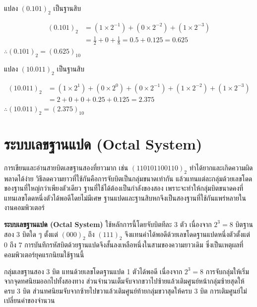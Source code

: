 \begin{ex}
\label{ex:bin-frac-to-dec}
แปลง $(0.101)_2$ เป็นฐานสิบ
\end{ex}
\begin{solution}
\begin{align*}
(0.101)_2 &= (1\times2^{-1})+(0\times2^{-2})+(1\times2^{-3})\\
&= \frac{1}{2} + 0 + \frac{1}{8} = 0.5 + 0.125 = 0.625
\end{align*}
$\therefore (0.101)_2 = (0.625)_{10}$ \solhere
\end{solution}

\begin{ex}
\label{ex:bin-mixed-to-dec}
แปลง $(10.011)_2$ เป็นฐานสิบ
\end{ex}
\begin{solution}
\begin{align*}
(10.011)_2 &= (1\times2^1)+(0\times2^0)+(0\times2^{-1})+(1\times2^{-2})+(1\times2^{-3})\\
&= 2 + 0 + 0 + 0.25 + 0.125 = 2.375
\end{align*}
$\therefore (10.011)_2 = (2.375)_{10}$ \solhere
\end{solution}

\section{ระบบเลขฐานแปด (Octal System)}
\label{sec:octal-system}

การเขียนและอ่านสายบิตเลขฐานสองที่ยาวมาก เช่น $(110101100110)_2$ ทำได้ยากและเกิดความผิดพลาดได้ง่าย วิธีลดความยาวที่ใช้กันคือการจับบิตเป็นกลุ่มขนาดเท่ากัน แล้วแทนแต่ละกลุ่มด้วยเลขโดดของฐานที่ใหญ่กว่าเพียงตัวเดียว ฐานที่ใช้ได้ต้องเป็นกำลังของสอง เพราะจะทำให้กลุ่มบิตขนาดคงที่แทนเลขโดดหนึ่งตัวได้พอดีโดยไม่มีเศษ ฐานแปดและฐานสิบหกจึงเป็นสองฐานที่ใช้กันแพร่หลายในงานคอมพิวเตอร์~\parencite{wakerly2018digital}

\textbf{ระบบเลขฐานแปด (Octal System)} ใช้หลักการนี้โดยจับบิตทีละ 3 ตัว เนื่องจาก $2^3 = 8$ บิตฐานสอง 3 บิตใด ๆ ตั้งแต่ $(000)_2$ ถึง $(111)_2$ จึงแทนค่าได้พอดีด้วยเลขโดดฐานแปดหนึ่งตัวตั้งแต่ $0$ ถึง $7$ การบันทึกรหัสบิตด้วยฐานแปดจึงสั้นลงเหลือหนึ่งในสามของความยาวเดิม ซึ่งเป็นเหตุผลที่คอมพิวเตอร์ยุคแรกนิยมใช้ฐานนี้

\begin{principle}
\label{principle:binary-octal-relation}
กลุ่มเลขฐานสอง 3 บิต แทนด้วยเลขโดดฐานแปด 1 ตัวได้พอดี เนื่องจาก $2^3 = 8$ การจับกลุ่มให้เริ่มจากจุดทศนิยมออกไปทั้งสองทาง ส่วนจำนวนเต็มจับจากขวาไปซ้ายแล้วเติมศูนย์หน้ากลุ่มซ้ายสุดให้ครบ 3 บิต ส่วนทศนิยมจับจากซ้ายไปขวาแล้วเติมศูนย์ท้ายกลุ่มขวาสุดให้ครบ 3 บิต การเติมศูนย์ไม่เปลี่ยนค่าของจำนวน
\end{principle}

